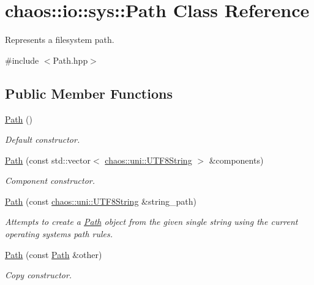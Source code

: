 \hypertarget{classchaos_1_1io_1_1sys_1_1_path}{}\section{chaos\+:\+:io\+:\+:sys\+:\+:Path Class Reference}
\label{classchaos_1_1io_1_1sys_1_1_path}


Represents a filesystem path.  




{\ttfamily \#include $<$Path.\+hpp$>$}

\subsection*{Public Member Functions}
\begin{DoxyCompactItemize}
\item 
\hyperlink{classchaos_1_1io_1_1sys_1_1_path_a4212b2acfcc365769080ea5e915568ee}{Path} ()
\begin{DoxyCompactList}\small\item\em Default constructor. \end{DoxyCompactList}\item 
\hyperlink{classchaos_1_1io_1_1sys_1_1_path_a3647583a07600e50e51d70f1dadabcf5}{Path} (const std\+::vector$<$ \hyperlink{classchaos_1_1uni_1_1_u_t_f8_string}{chaos\+::uni\+::\+U\+T\+F8\+String} $>$ \&components)
\begin{DoxyCompactList}\small\item\em Component constructor. \end{DoxyCompactList}\item 
\hyperlink{classchaos_1_1io_1_1sys_1_1_path_a1a18b44624caafeceb66edc7b99dbad6}{Path} (const \hyperlink{classchaos_1_1uni_1_1_u_t_f8_string}{chaos\+::uni\+::\+U\+T\+F8\+String} \&string\+\_\+path)
\begin{DoxyCompactList}\small\item\em Attempts to create a \hyperlink{classchaos_1_1io_1_1sys_1_1_path}{Path} object from the given single string using the current operating system\textquotesingle{}s path rules. \end{DoxyCompactList}\item 
\hyperlink{classchaos_1_1io_1_1sys_1_1_path_a40b3bf651b667adbd3eeb1ee55564211}{Path} (const \hyperlink{classchaos_1_1io_1_1sys_1_1_path}{Path} \&other)
\begin{DoxyCompactList}\small\item\em Copy constructor. \end{DoxyCompactList}\item 

\end{DoxyCompactItemize}
